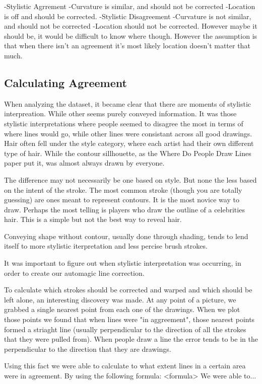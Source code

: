 -Stylistic Agrrement
	-Curvature is similar, and should not be corrected
	-Location is off and should be corrected.
-Stylistic Disagreement
	-Curvature is not similar, and should not be corrected
	-Location should not be corrected. However maybe it should be, it would be difficult to know where though. However the assumption is that when there isn't an agreement it's most likely location doesn't matter that much.

\subsection{Calculating Agreement}
When analyzing the dataset, it became clear that there are moments of stylistic interpreation. While other seems purely conveyed information. It was those stylistic interpretations where people seemed to disagree the most in terms of where lines would go, while other lines were consistant across all good drawings. Hair often fell under the style category, where each artist had their own different type of hair. While the contour sillhouette, as the Where Do People Draw Lines paper put it, was almost always drawn by everyone. 

The difference may not necessarily be one based on style. But none the less based on the intent of the stroke. The most common stroke (though you are totally guessing) are ones meant to represent contours. It is the most novice way to draw. Perhaps the most telling is players who draw the outline of a celebrities hair. This is a simple but not the best way to reveal hair. 

Conveying shape without contour, usually done through shading, tends to lend itself to more stylistic iterpretation and less percise brush strokes. 

It was important to figure out when stylistic interpretation was occurring, in order to create our automagic line correction. 

To calculate which strokes should be corrected and warped and which should be left alone, an interesting discovery was made. At any point of a picture, we grabbed a single nearest point from each one of the drawings. When we plot those points we found that when lines were "in aggreement", those nearest points formed a striaght line (usually perpendicular to the direction of all the strokes that they were pulled from). When people draw a line the error tends to be in the perpendicular to the direction that they are drawings.

Using this fact we were able to calculate to what extent lines in a certain area were in agreement. By using the following formula:
<formula>
We were able to...

